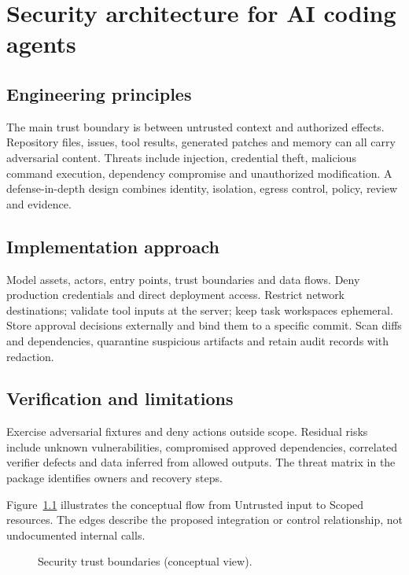 \chapter{Security architecture for AI coding agents}

\section{Engineering principles}

The main trust boundary is between untrusted context and authorized effects. Repository files, issues, tool results, generated patches and memory can all carry adversarial content. Threats include injection, credential theft, malicious command execution, dependency compromise and unauthorized modification. A defense-in-depth design combines identity, isolation, egress control, policy, review and evidence.

\section{Implementation approach}

Model assets, actors, entry points, trust boundaries and data flows. Deny production credentials and direct deployment access. Restrict network destinations; validate tool inputs at the server; keep task workspaces ephemeral. Store approval decisions externally and bind them to a specific commit. Scan diffs and dependencies, quarantine suspicious artifacts and retain audit records with redaction.

\section{Verification and limitations}

Exercise adversarial fixtures and deny actions outside scope. Residual risks include unknown vulnerabilities, compromised approved dependencies, correlated verifier defects and data inferred from allowed outputs. The threat matrix in the package identifies owners and recovery steps.

Figure~\ref{fig:d19} illustrates the conceptual flow from Untrusted input to Scoped resources. The edges describe the proposed integration or control relationship, not undocumented internal calls.

\begin{figure}[htbp]\centering\caption{Security trust boundaries (conceptual view).}\label{fig:d19}\end{figure}

